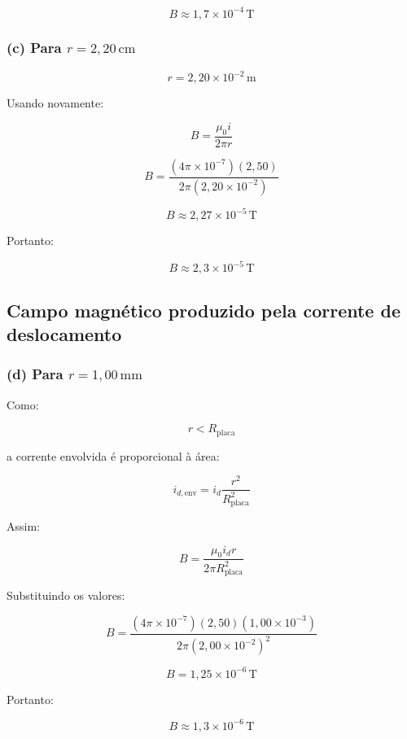 \documentclass[12pt,a4paper]{article}
\begin{document}
\[
\boxed{
B \approx 1,7\times10^{-4}\,\text{T}
}
\]


\subsubsection*{(c) Para $r = 2,20\,\text{cm}$}

\[
r = 2,20\times10^{-2}\,\text{m}
\]

Usando novamente:

\[
B =
\frac{\mu_0 i}{2\pi r}
\]

\[
B =
\frac{
(4\pi\times10^{-7})(2,50)
}
{
2\pi(2,20\times10^{-2})
}
\]

\[
B \approx 2,27\times10^{-5}\,\text{T}
\]

Portanto:

\[
\boxed{
B \approx 2,3\times10^{-5}\,\text{T}
}
\]

\subsection*{Campo magnético produzido pela corrente de deslocamento}

\subsubsection*{(d) Para $r = 1,00\,\text{mm}$}

Como:

\[
r < R_{\text{placa}}
\]

a corrente envolvida é proporcional à área:

\[
i_{d,\text{env}}
=
i_d
\frac{r^2}{R_{\text{placa}}^2}
\]

Assim:

\[
B =
\frac{\mu_0 i_d r}
{2\pi R_{\text{placa}}^2}
\]

Substituindo os valores:

\[
B =
\frac{
(4\pi\times10^{-7})(2,50)(1,00\times10^{-3})
}
{
2\pi(2,00\times10^{-2})^2
}
\]

\[
B = 1,25\times10^{-6}\,\text{T}
\]

Portanto:

\[
\boxed{
B \approx 1,3\times10^{-6}\,\text{T}
}
\]

\end{document}
